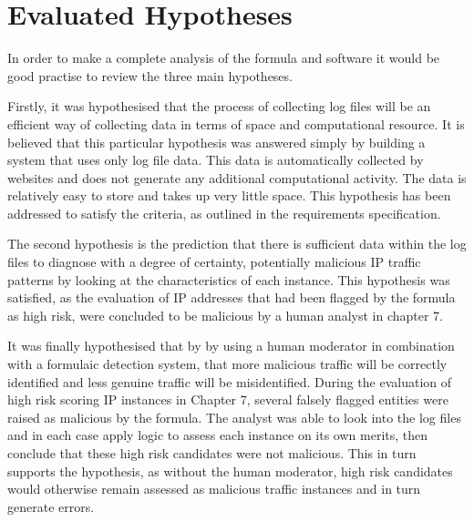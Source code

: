 \section{Evaluated Hypotheses}

In order to make a complete analysis of the formula and software it would be good practise to review the three main hypotheses.  

Firstly, it was hypothesised that the process of collecting log files will be an efficient way of collecting data in terms of space and computational resource. It is believed that this particular hypothesis was answered simply by building a system that uses only log file data. This data is automatically collected by websites and does not generate any additional computational activity. The data is relatively easy to store and takes up very little space. This hypothesis has been addressed to satisfy the criteria, as outlined in the requirements specification.

The second hypothesis is the prediction that there is sufficient data within the log files to diagnose with a degree of certainty, potentially malicious IP traffic patterns by looking at the characteristics of each instance. This hypothesis was satisfied, as the evaluation of IP addresses that had been flagged by the formula as high risk, were concluded to be malicious by a human analyst in chapter 7.  

It was finally hypothesised that by by using a human moderator in combination with a formulaic detection system, that more malicious traffic will be correctly identified and less genuine traffic will be misidentified. During the evaluation of high risk scoring IP instances in Chapter 7, several falsely flagged entities were raised as malicious by the formula. The analyst was able to look into the log files and in each case apply logic to assess each instance on its own merits, then conclude that these high risk candidates were not malicious. This in turn supports the hypothesis, as without the human moderator, high risk candidates would otherwise remain assessed as malicious traffic instances and in turn generate errors.  

